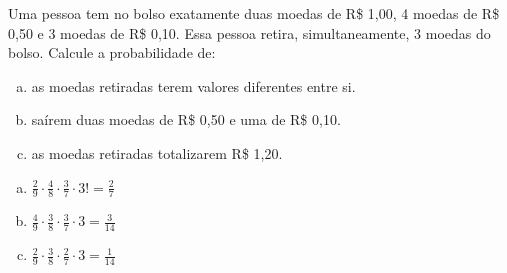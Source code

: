 \begin{ex}
Uma pessoa tem no bolso exatamente duas moedas de R\$ 1,00, 4 moedas de R\$ 0,50 e 3 moedas de R\$ 0,10. Essa pessoa retira, simultaneamente, 3 moedas do bolso. Calcule a probabilidade de:
   \begin{enumerate}[(a)]
   \item as moedas retiradas terem valores diferentes entre si.
   \item saírem duas moedas de R\$ 0,50 e uma de R\$ 0,10.
   \item as moedas retiradas totalizarem R\$ 1,20.
   \end{enumerate}
     \begin{sol}
      \phantom{A}
        \begin{enumerate} [(a)]
            \item $\frac{2}{9}\cdot\frac{4}{8}\cdot\frac{3}{7}\cdot3!=\frac{2}{7}$
            \item $\frac{4}{9}\cdot\frac{3}{8}\cdot\frac{3}{7}\cdot3=\frac{3}{14}$
            \item $\frac{2}{9}\cdot\frac{3}{8}\cdot\frac{2}{7}\cdot3=\frac{1}{14}$
            \end{enumerate}
     \end{sol}
\end{ex}